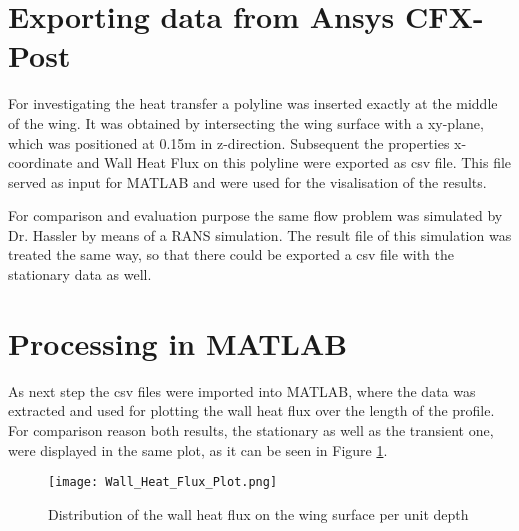 \section{Exporting data from Ansys CFX-Post}
For investigating the heat transfer a polyline was inserted exactly at the middle of the wing. It was obtained by intersecting the wing surface with a xy-plane, which was positioned at 0.15m in z-direction. 
Subsequent the properties x-coordinate and Wall Heat Flux on this polyline were exported as csv file. This file served as input for MATLAB\textsuperscript{\textregistered} and were used for the visalisation of the results.

For comparison and evaluation purpose the same flow problem was simulated by Dr. Hassler by means of a RANS simulation. The result file of this simulation was treated the same way, so that there could be exported a csv file with the stationary data as well.

\section{Processing in MATLAB\textsuperscript{\textregistered}}
As next step the csv files were imported into MATLAB\textsuperscript{\textregistered}, where the data was extracted and used for plotting the wall heat flux over the length of the profile. For comparison reason both results, the stationary as well as the transient one, were displayed in the same plot, as it can be seen in Figure \ref{fig:whf_plot}.

\begin{figure}[ht]
\centering
\texttt{[image: Wall\_Heat\_Flux\_Plot.png]}
\caption{Distribution of the wall heat flux on the wing surface per unit depth}
\label{fig:whf_plot}
\end{figure}

